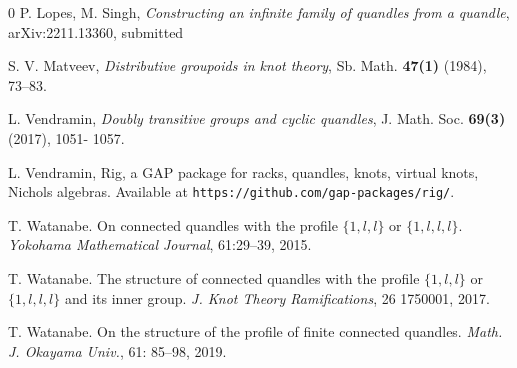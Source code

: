 \documentclass{article}
\begin{document}
\begin{thebibliography}{0}
    P. Lopes, M. Singh, \emph{Constructing an infinite family of quandles from a quandle}, arXiv:2211.13360, submitted

    S. V. Matveev, \emph{Distributive groupoids in knot theory}, Sb. Math. {\bf47(1)} (1984), 73--83.



    L. Vendramin, \emph{Doubly transitive groups and cyclic quandles}, J. Math. Soc. \textbf{69(3)} (2017), 1051-
1057.

    L. Vendramin, Rig, a GAP package for racks, quandles, knots, virtual knots, Nichols algebras. Available at \texttt{https://github.com/gap-packages/rig/}.

    T. Watanabe. \newblock  On connected quandles with the profile $\{1, l, l\}$ or $\{1, l, l, l\}$. \newblock  \emph{Yokohama Mathematical Journal}, 61:29--39, 2015.

    T. Watanabe. \newblock  The structure of connected quandles with the profile $\{1,l,l\}$ or $\{1,l,l,l\}$ and its inner group. \newblock  \emph{J. Knot Theory Ramifications}, 26 1750001, 2017.

    T. Watanabe. \newblock  On the structure of the profile of finite connected quandles. \newblock  \emph{Math. J. Okayama Univ.}, 61: 85--98, 2019.

\end{thebibliography}
\end{document}
